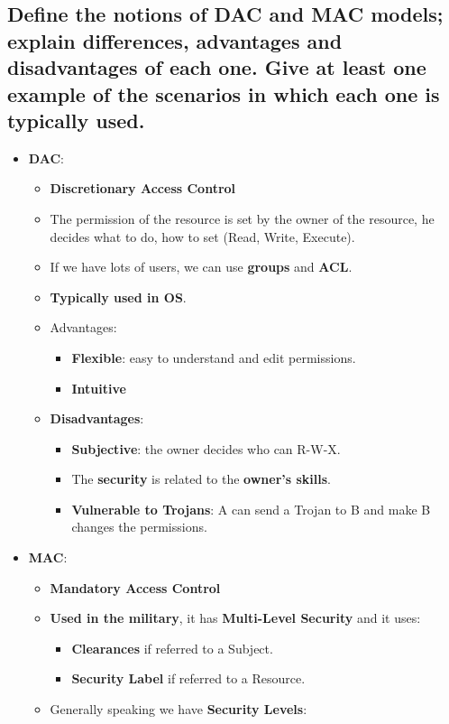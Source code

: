 \documentclass[9pt, letterpaper]{article}
\begin{document}
\subsection{Define the notions of DAC and MAC models; explain differences, advantages and disadvantages of each one. Give at least one example of the scenarios in which each one is typically used.}
\begin{itemize}
	\item \textbf{DAC}: 
	\begin{itemize}
		\item \textbf{Discretionary Access Control}
		\item The permission of the resource is set by the owner of the resource, he decides what to do, how to set (Read, Write, Execute).
		\item If we have lots of users, we can use \textbf{groups} and \textbf{ACL}.
		\item \textbf{Typically used in OS}.
		\item Advantages:
		\begin{itemize}
			\item \textbf{Flexible}: easy to understand and edit permissions.
			\item \textbf{Intuitive}
		\end{itemize}
		\item \textbf{Disadvantages}:
		\begin{itemize}
			\item \textbf{Subjective}: the owner decides who can R-W-X.
			\item The \textbf{security} is related to the \textbf{owner's skills}.
			\item \textbf{Vulnerable to Trojans}: A can send a Trojan to B and make B changes the permissions.
		\end{itemize}	 
	\end{itemize}
	\item \textbf{MAC}: 
	\begin{itemize}
		\item \textbf{Mandatory Access Control}
		\item \textbf{Used in the military}, it has \textbf{Multi-Level Security} and it uses:
		\begin{itemize}
			\item \textbf{Clearances} if referred to a Subject.
			\item \textbf{Security Label} if referred to a Resource.
		\end{itemize}
		\item Generally speaking we have \textbf{Security Levels}:

\end{itemize}
\end{itemize}
\end{document}
